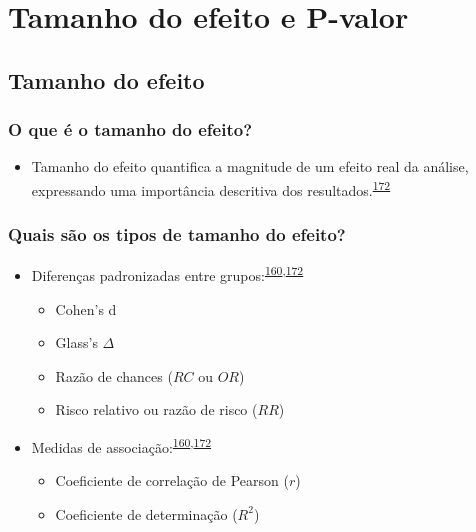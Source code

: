 \documentclass[
  a4paper,
]{book}
\providecommand{\tightlist}{%
  \setlength{\itemsep}{0pt}\setlength{\parskip}{0pt}}
\begin{document}
\hypertarget{efeito-pvalor}{%
\chapter{\texorpdfstring{\textbf{Tamanho do efeito e P-valor}}{Tamanho do efeito e P-valor}}\label{efeito-pvalor}}

\hypertarget{tamanho-efeito}{%
\section{Tamanho do efeito}\label{tamanho-efeito}}

\hypertarget{o-que-uxe9-o-tamanho-do-efeito}{%
\subsection{O que é o tamanho do efeito?}\label{o-que-uxe9-o-tamanho-do-efeito}}

\begin{itemize}
\tightlist
\item
  Tamanho do efeito quantifica a magnitude de um efeito real da análise, expressando uma importância descritiva dos resultados.\textsuperscript{\protect\hyperlink{ref-Kim2015}{172}}
\end{itemize}

\hypertarget{quais-suxe3o-os-tipos-de-tamanho-do-efeito}{%
\subsection{Quais são os tipos de tamanho do efeito?}\label{quais-suxe3o-os-tipos-de-tamanho-do-efeito}}

\begin{itemize}
\item
  Diferenças padronizadas entre grupos:\textsuperscript{\protect\hyperlink{ref-Sullivan2012}{160},\protect\hyperlink{ref-Kim2015}{172}}

  \begin{itemize}
  \item
    Cohen's d
  \item
    Glass's \(\Delta\)
  \item
    Razão de chances (\(RC\) ou \(OR\))
  \item
    Risco relativo ou razão de risco (\(RR\))
  \end{itemize}
\item
  Medidas de associação:\textsuperscript{\protect\hyperlink{ref-Sullivan2012}{160},\protect\hyperlink{ref-Kim2015}{172}}

  \begin{itemize}
  \item
    Coeficiente de correlação de Pearson (\(r\))
  \item
    Coeficiente de determinação (\(R^2\))
  \end{itemize}
\end{itemize}
\end{document}
